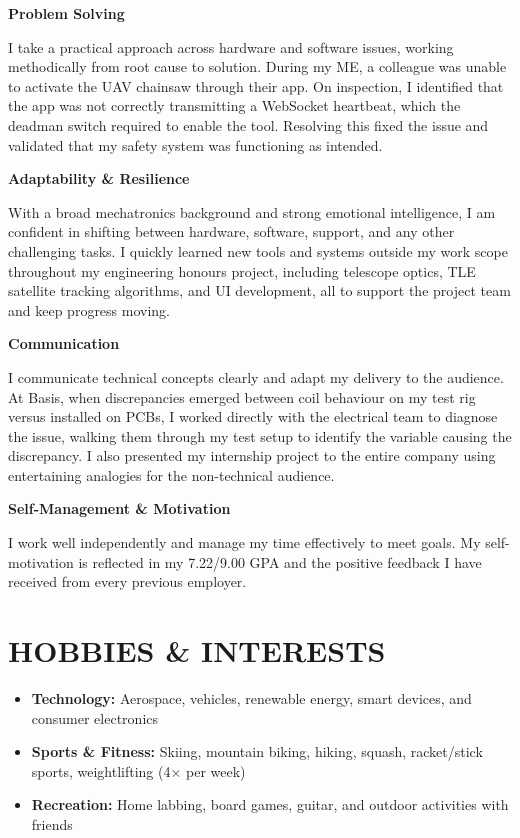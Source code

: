 \documentclass[11pt, a4paper]{article}
\begin{document}
\textbf{Problem Solving}

I take a practical approach across hardware and software issues, working methodically from
root cause to solution. During my ME, a colleague was unable to activate the UAV chainsaw
through their app. On inspection, I identified that the app was not correctly transmitting
a WebSocket heartbeat, which the deadman switch required to enable the tool. Resolving this
fixed the issue and validated that my safety system was functioning as intended.

\vspace{3pt}
\textbf{Adaptability \& Resilience}

With a broad mechatronics background and strong emotional intelligence, I am confident in
shifting between hardware, software, support, and any other challenging tasks. I quickly
learned new tools and systems outside my work scope throughout my engineering honours
project, including telescope optics, TLE satellite tracking algorithms, and UI development,
all to support the project team and keep progress moving.

\vspace{3pt}
\textbf{Communication}

I communicate technical concepts clearly and adapt my delivery to the audience. At Basis,
when discrepancies emerged between coil behaviour on my test rig versus installed on PCBs,
I worked directly with the electrical team to diagnose the issue, walking them through my
test setup to identify the variable causing the discrepancy. I also presented my internship
project to the entire company using entertaining analogies for the non-technical audience.

\vspace{3pt}
\textbf{Self-Management \& Motivation}

I work well independently and manage my time effectively to meet goals. My self-motivation
is reflected in my 7.22/9.00 GPA and the positive feedback I have received from every
previous employer.

\section{HOBBIES \& INTERESTS}

\begin{itemize}
  \item \textbf{Technology:} Aerospace, vehicles, renewable energy, smart devices, and
        consumer electronics
  \item \textbf{Sports \& Fitness:} Skiing, mountain biking, hiking, squash,
        racket/stick sports, weightlifting (4$\times$ per week)
  \item \textbf{Recreation:} Home labbing, board games, guitar, and outdoor activities
        with friends
\end{itemize}
\end{document}

